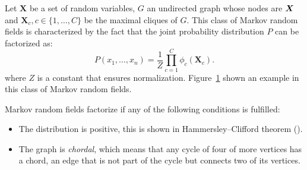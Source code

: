 Let \(\bm{X}\) be a set of random variables, \(G\) an undirected graph whose nodes are \(\bm{X}\) and \(\bm{X}_c, c \in \{1,\dots,C\}\) be the maximal cliques of \(G\). This class of Markov random fields is characterized by the fact that the joint probability distribution \(P\) can be factorized as:
\[
P(x_1,\dots,x_n) = \frac{1}{Z}\prod_{ c = 1 }^{C}\phi_c(\bm{X}_c).
\]
where \(Z\) is a constant that ensures normalization. Figure~\ref{fig:mn_example} shown an example in this class of Markov random fields.

Markov random fields factorize if any of the following conditions is fulfilled:
\begin{itemize}
  \item The distribution is positive, this is shown in Hammersley–Clifford theorem (\cite{grimmett1973theorem}).
  \item The graph is \emph{chordal}, which means that any cycle of four of more vertices has a chord, an edge that is not part of the cycle but connects two of its vertices.
\end{itemize}


\begin{figure}[h]
\centering
{}
\label{fig:mn_example}
\end{figure}

